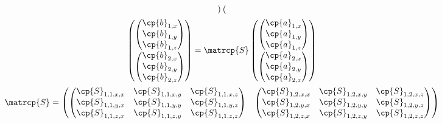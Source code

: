 \begin{refsection}
\begin{equation}
\begin{gathered}
\begin{pmatrix}
    \end{pmatrix}
    \\
    \begin{pmatrix}
        \begin{pmatrix}
            \cp{b}_{1, x} \\ \cp{b}_{1, y} \\ \cp{b}_{1, z}
        \end{pmatrix}
        \\
        \begin{pmatrix}
            \cp{b}_{2, x} \\ \cp{b}_{2, y} \\ \cp{b}_{2, z}
        \end{pmatrix}
    \end{pmatrix}
    =
    \matrcp{S}
    \begin{pmatrix}
        \begin{pmatrix}
            \cp{a}_{1, x} \\ \cp{a}_{1, y} \\ \cp{a}_{1, z}
        \end{pmatrix}
        \\
        \begin{pmatrix}
            \cp{a}_{2, x} \\ \cp{a}_{2, y} \\ \cp{a}_{2, z}
        \end{pmatrix}
    \end{pmatrix}
    \\
    \matrcp{S} =
    \begin{pmatrix}
        \begin{pmatrix}
            \cp{S}_{1, 1, x, x} & \cp{S}_{1, 1, x, y} & \cp{S}_{1, 1, x, z} \\
            \cp{S}_{1, 1, y, x} & \cp{S}_{1, 1, y, y} & \cp{S}_{1, 1, y, z} \\
            \cp{S}_{1, 1, z, x} & \cp{S}_{1, 1, z, y} & \cp{S}_{1, 1, z, z} \\
        \end{pmatrix}
        &
        \begin{pmatrix}
            \cp{S}_{1, 2, x, x} & \cp{S}_{1, 2, x, y} & \cp{S}_{1, 2, x, z} \\
            \cp{S}_{1, 2, y, x} & \cp{S}_{1, 2, y, y} & \cp{S}_{1, 2, y, z} \\
            \cp{S}_{1, 2, z, x} & \cp{S}_{1, 2, z, y} & \cp{S}_{1, 2, z, z} \\
        \end{pmatrix}

\end{pmatrix}
\end{gathered}
\end{equation}
\end{refsection}
